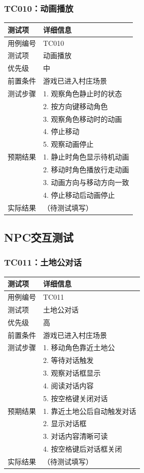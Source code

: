 \documentclass[a4paper,12pt]{article}
\begin{document}
\subsubsection{TC010：动画播放}
\begin{table}[h]
\centering
\begin{tabular}{ll}
\toprule
测试项 & 详细信息 \\
\midrule
用例编号 & TC010 \\
测试项 & 动画播放 \\
优先级 & 中 \\
前置条件 & 游戏已进入村庄场景 \\
测试步骤 & 1. 观察角色静止时的状态 \\
 & 2. 按方向键移动角色 \\
 & 3. 观察角色移动时的动画 \\
 & 4. 停止移动 \\
 & 5. 观察动画停止 \\
预期结果 & 1. 静止时角色显示待机动画 \\
 & 2. 移动时角色播放行走动画 \\
 & 3. 动画方向与移动方向一致 \\
 & 4. 停止移动后动画停止 \\
实际结果 & （待测试填写） \\
\bottomrule
\end{tabular}
\end{table}

\subsection{NPC交互测试}

\subsubsection{TC011：土地公对话}
\begin{table}[h]
\centering
\begin{tabular}{ll}
\toprule
测试项 & 详细信息 \\
\midrule
用例编号 & TC011 \\
测试项 & 土地公对话 \\
优先级 & 高 \\
前置条件 & 游戏已进入村庄场景 \\
测试步骤 & 1. 移动角色靠近土地公 \\
 & 2. 等待对话触发 \\
 & 3. 观察对话框显示 \\
 & 4. 阅读对话内容 \\
 & 5. 按空格键关闭对话 \\
预期结果 & 1. 靠近土地公后自动触发对话 \\
 & 2. 显示对话框 \\
 & 3. 对话内容清晰可读 \\
 & 4. 按空格键后对话框关闭 \\
实际结果 & （待测试填写） \\
\bottomrule
\end{tabular}
\end{table}
\end{document}
